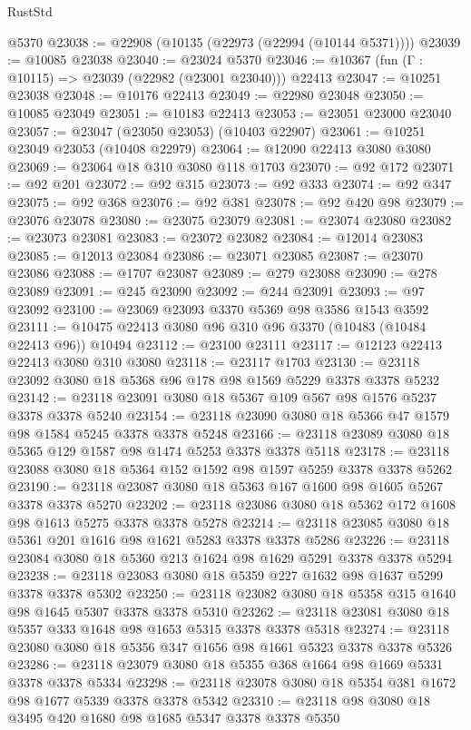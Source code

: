 \begin{lexlean}{RustStd}
\begin{coremodule}
    @5370
@23038 := @22908 (@10135 (@22973 (@22994 (@10144 @5371))))
@23039 := @10085 @23038
@23040 := @23024 @5370
@23046 := @10367 (fun (Γ : @10115) => @23039 (@22982 (@23001 @23040))) @22413
@23047 := @10251 @23038
@23048 := @10176 @22413
@23049 := @22980 @23048
@23050 := @10085 @23049
@23051 := @10183 @22413
@23053 := @23051 @23000 @23040
@23057 := @23047 (@23050 @23053) (@10403 @22907)
@23061 := @10251 @23049 @23053 (@10408 @22979)
@23064 := @12090 @22413 @3080 @3080
@23069 := @23064 @18 @310 @3080 @118 @1703
@23070 := @92 @172
@23071 := @92 @201
@23072 := @92 @315
@23073 := @92 @333
@23074 := @92 @347
@23075 := @92 @368
@23076 := @92 @381
@23078 := @92 @420 @98
@23079 := @23076 @23078
@23080 := @23075 @23079
@23081 := @23074 @23080
@23082 := @23073 @23081
@23083 := @23072 @23082
@23084 := @12014 @23083
@23085 := @12013 @23084
@23086 := @23071 @23085
@23087 := @23070 @23086
@23088 := @1707 @23087
@23089 := @279 @23088
@23090 := @278 @23089
@23091 := @245 @23090
@23092 := @244 @23091
@23093 := @97 @23092
@23100 := @23069 @23093 @3370 @5369 @98 @3586 @1543 @3592
@23111 := @10475 @22413 @3080 @96 @310 @96 @3370 (@10483 (@10484 @22413 @96)) @10494
@23112 := @23100 @23111
@23117 := @12123 @22413 @22413 @3080 @310 @3080
@23118 := @23117 @1703
@23130 := @23118 @23092 @3080 @18 @5368 @96 @178 @98 @1569 @5229 @3378 @3378 @5232
@23142 := @23118 @23091 @3080 @18 @5367 @109 @567 @98 @1576 @5237 @3378 @3378 @5240
@23154 := @23118 @23090 @3080 @18 @5366 @47 @1579 @98 @1584 @5245 @3378 @3378 @5248
@23166 := @23118 @23089 @3080 @18 @5365 @129 @1587 @98 @1474 @5253 @3378 @3378 @5118
@23178 := @23118 @23088 @3080 @18 @5364 @152 @1592 @98 @1597 @5259 @3378 @3378 @5262
@23190 := @23118 @23087 @3080 @18 @5363 @167 @1600 @98 @1605 @5267 @3378 @3378 @5270
@23202 := @23118 @23086 @3080 @18 @5362 @172 @1608 @98 @1613 @5275 @3378 @3378 @5278
@23214 := @23118 @23085 @3080 @18 @5361 @201 @1616 @98 @1621 @5283 @3378 @3378 @5286
@23226 := @23118 @23084 @3080 @18 @5360 @213 @1624 @98 @1629 @5291 @3378 @3378 @5294
@23238 := @23118 @23083 @3080 @18 @5359 @227 @1632 @98 @1637 @5299 @3378 @3378 @5302
@23250 := @23118 @23082 @3080 @18 @5358 @315 @1640 @98 @1645 @5307 @3378 @3378 @5310
@23262 := @23118 @23081 @3080 @18 @5357 @333 @1648 @98 @1653 @5315 @3378 @3378 @5318
@23274 := @23118 @23080 @3080 @18 @5356 @347 @1656 @98 @1661 @5323 @3378 @3378 @5326
@23286 := @23118 @23079 @3080 @18 @5355 @368 @1664 @98 @1669 @5331 @3378 @3378 @5334
@23298 := @23118 @23078 @3080 @18 @5354 @381 @1672 @98 @1677 @5339 @3378 @3378 @5342
@23310 := @23118 @98 @3080 @18 @3495 @420 @1680 @98 @1685 @5347 @3378 @3378 @5350

\end{coremodule}
\end{lexlean}
